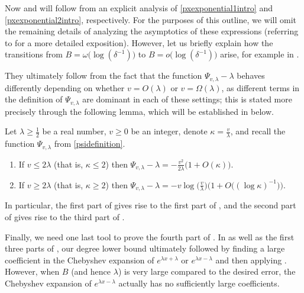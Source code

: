     
    Now  and  will follow from an explicit analysis of \eqref{pxexponential1intro} and \eqref{pxexponential2intro}, respectively. For the purposes of this outline, we will omit the remaining details of analyzing the asymptotics of these expressions (referring to  for a more detailed exposition). However, let us briefly explain how the transitions from $B = \omega \big( \log (\delta^{-1}) \big)$ to $B = o \big( \log (\delta^{-1}) \big)$ arise, for example in . 
    
    They ultimately follow from the fact that the function $\Psi_{v, \lambda} - \lambda$ behaves differently depending on whether $v = O(\lambda)$ or $v = \Omega (\lambda)$, as different terms in the definition of $\Psi_{v, \lambda}$ are dominant in each of these settings; this is stated more precisely through the following lemma, which will be established in  below. 
	
		
	\begin{lemma}
	
	\label{psivlambdakappa} 
	
	Let $\lambda \ge \frac{1}{2}$ be a real number, $v \ge 0$ be an integer, denote $\kappa = \frac{v}{\lambda}$, and recall the function $\Psi_{v, \lambda}$ from \eqref{psidefinition}. 
	
	\begin{enumerate} 
	
	\item If $v \le 2 \lambda$ (that is, $\kappa \le 2$) then $\Psi_{v, \lambda} - \lambda = - \displaystyle\frac{v^2}{2 \lambda} \big( 1 + O(\kappa) \big)$.
	
	\item If $v \ge 2 \lambda$ (that is, $\kappa \ge 2$) then $\Psi_{v, \lambda} - \lambda= - v \log \Big( \displaystyle\frac{v}{\lambda} \Big) \Big( 1 + O \big( (\log \kappa)^{-1} \big) \Big)$.
	
	\end{enumerate}
	
	
	\end{lemma} 

    \noindent In particular, the first part of  gives rise to the first part of , and the second part of  gives rise to the third part of . 
    
    
    Finally, we need one last tool to prove the fourth part of . In  as well as the first three parts of , our degree lower bound ultimately followed by finding a large coefficient in the Chebyshev expansion of $e^{\lambda x + \lambda}$ or $e^{\lambda x - \lambda}$ and then applying . However, when $B$ (and hence $\lambda$) is very large compared to the desired error, the Chebyshev expansion of $e^{\lambda x - \lambda}$ actually has no sufficiently large coefficients.
    
